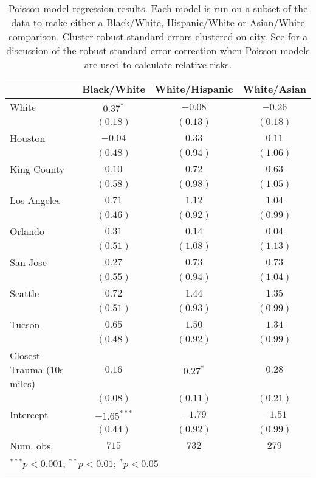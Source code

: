 
\begin{table}[ht!]
\begin{center}
\begin{tabular}{l c c c}
\toprule
 & Black/White & White/Hispanic & White/Asian \\
\midrule
White                      & $0.37^{*}$    & $-0.08$    & $-0.26$  \\
                           & $(0.18)$      & $(0.13)$   & $(0.18)$ \\
Houston                    & $-0.04$       & $0.33$     & $0.11$   \\
                           & $(0.48)$      & $(0.94)$   & $(1.06)$ \\
King County                & $0.10$        & $0.72$     & $0.63$   \\
                           & $(0.58)$      & $(0.98)$   & $(1.05)$ \\
Los Angeles                & $0.71$        & $1.12$     & $1.04$   \\
                           & $(0.46)$      & $(0.92)$   & $(0.99)$ \\
Orlando                    & $0.31$        & $0.14$     & $0.04$   \\
                           & $(0.51)$      & $(1.08)$   & $(1.13)$ \\
San Jose                   & $0.27$        & $0.73$     & $0.73$   \\
                           & $(0.55)$      & $(0.94)$   & $(1.04)$ \\
Seattle                    & $0.72$        & $1.44$     & $1.35$   \\
                           & $(0.51)$      & $(0.93)$   & $(0.99)$ \\
Tucson                     & $0.65$        & $1.50$     & $1.34$   \\
                           & $(0.48)$      & $(0.92)$   & $(0.99)$ \\
Closest Trauma (10s miles) & $0.16$        & $0.27^{*}$ & $0.28$   \\
                           & $(0.08)$      & $(0.11)$   & $(0.21)$ \\
Intercept                  & $-1.65^{***}$ & $-1.79$    & $-1.51$  \\
                           & $(0.44)$      & $(0.92)$   & $(0.99)$ \\
\midrule
Num. obs.                  & $715$         & $732$      & $279$    \\
\bottomrule
\multicolumn{4}{l}{\scriptsize{$^{***}p<0.001$; $^{**}p<0.01$; $^{*}p<0.05$}}
\end{tabular}
\caption{Poisson model regression results. Each model is run on a subset of the data to make either a Black/White, Hispanic/White or Asian/White comparison. Cluster-robust standard errors clustered on city. See \citet{zou2004modified} for a discussion of the robust standard error correction when Poisson models are used to calculate relative risks.}
\label{table:regression_all_comparisons_glm}
\end{center}
\end{table}
